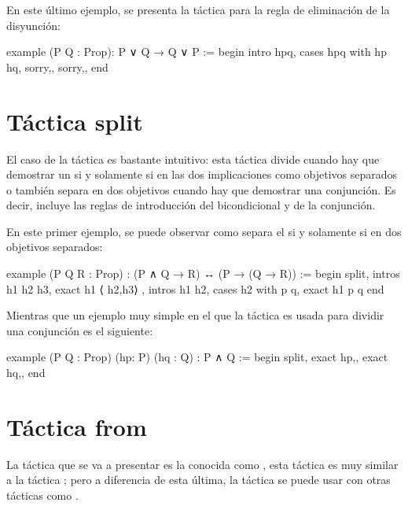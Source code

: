 En este último ejemplo, se presenta la táctica  para la
regla de eliminación de la disyunción:

\begin{leancode}
example (P Q : Prop): P ∨ Q → Q ∨ P :=
begin
  intro hpq,
  cases hpq with hp hq,
  {sorry,},
  {sorry,},
end
\end{leancode}


\section{Táctica split}

El caso de la táctica  es bastante intuitivo: esta táctica
divide cuando hay que demostrar un si y solamente si en las dos implicaciones
como objetivos separados o también separa en dos objetivos cuando hay que
demostrar una conjunción. Es decir, incluye las reglas de introducción
del bicondicional y de la conjunción.

En este primer ejemplo, se puede observar como separa el si y solamente si en
dos objetivos separados:

\begin{leancode}
example (P Q R : Prop) : (P ∧ Q → R) ↔ (P → (Q → R)) :=
begin
  split,
  { intros h1 h2 h3,
    exact h1 ⟨ h2,h3⟩ },
  { intros h1 h2,
    cases h2 with p q,
    exact h1 p q}
end
\end{leancode}

Mientras que un ejemplo muy simple en el que la táctica 
es usada para dividir una conjunción es el siguiente:
\begin{leancode}
example (P Q : Prop) (hp: P) (hq : Q) : P ∧ Q :=
begin
  split,
  { exact hp,},
  { exact hq,},
end
\end{leancode}

\section{Táctica from}

La táctica que se va a presentar es la conocida como , esta
táctica es muy similar a la táctica ; pero a diferencia
de esta última, la táctica  se puede usar con otras tácticas
como .

